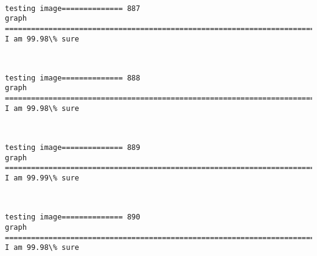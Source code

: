 \documentclass[11pt]{article}
\begin{document}
    \begin{center}
    \end{center}
    { \hspace*{\fill} \\}
    
    \begin{Verbatim}[commandchars=\\\{\}]
testing image============== 887
graph
============================================================================
I am 99.98\% sure

    \end{Verbatim}

    \begin{center}
    \end{center}
    { \hspace*{\fill} \\}
    
    \begin{Verbatim}[commandchars=\\\{\}]
testing image============== 888
graph
============================================================================
I am 99.98\% sure

    \end{Verbatim}

    \begin{center}
    \end{center}
    { \hspace*{\fill} \\}
    
    \begin{Verbatim}[commandchars=\\\{\}]
testing image============== 889
graph
============================================================================
I am 99.99\% sure

    \end{Verbatim}

    \begin{center}
    \end{center}
    { \hspace*{\fill} \\}
    
    \begin{Verbatim}[commandchars=\\\{\}]
testing image============== 890
graph
============================================================================
I am 99.98\% sure

    \end{Verbatim}
\end{document}
